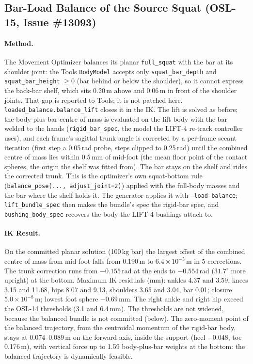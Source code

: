 \documentclass[11pt,a4paper]{article}
\begin{document}
\subsection{Bar-Load Balance of the Source Squat (OSL-15, Issue \#13093)}

\paragraph{Method.} The Movement Optimizer balances its planar
\texttt{full\_squat} with the bar at its shoulder joint: the Tools
\texttt{BodyModel} accepts only \texttt{squat\_bar\_depth} and
\texttt{squat\_bar\_height} $\ge 0$ (bar behind or below the shoulder), so it
cannot express the back-bar shelf, which sits 0.20\,m above and 0.06\,m in
front of the shoulder joints. That gap is reported to Tools; it is not
patched here. \texttt{loaded\_balance.balance\_lift} closes it in the IK. The
lift is solved as before; the body-plus-bar centre of mass is evaluated on the
lift body with the bar welded to the hands (\texttt{rigid\_bar\_spec}, the
model the LIFT-4 re-track controller uses), and each frame's sagittal trunk
angle is corrected by a per-frame secant iteration (first step a 0.05\,rad
probe, steps clipped to 0.25\,rad) until the combined centre of mass lies
within 0.5\,mm of mid-foot (the mean floor point of the contact spheres, the
origin the shelf was fitted from). The bar stays on the shelf and rides the
corrected trunk. This is the optimizer's own squat-bottom rule
(\texttt{balance\_pose(..., adjust\_joint=2)}) applied with the full-body
masses and the bar where the shelf holds it. The generator applies it with
\texttt{--load-balance}; \texttt{lift\_bundle\_spec} then makes the bundle's
spec the rigid-bar spec, and \texttt{bushing\_body\_spec} recovers the body
the LIFT-4 bushings attach to.

\paragraph{IK Result.} On the committed planar solution (100\,kg bar) the
largest offset of the combined centre of mass from mid-foot falls from
0.190\,m to $6.4\times10^{-5}$\,m in 5 corrections. The trunk correction
runs from $-0.155$\,rad at the ends to $-0.554$\,rad ($31.7^\circ$ more
upright) at the bottom. Maximum IK residuals (mm): ankles 4.37 and 3.59,
knees 3.15 and 11.68, hips 8.07 and 9.13, shoulders 3.65 and 3.04, bar 0.01;
closure $5.0\times10^{-8}$\,m; lowest foot sphere $-0.69$\,mm. The right ankle
and right hip exceed the OSL-14 thresholds (3.1 and 6.4\,mm). The thresholds
are not widened, because the balanced bundle is not committed (below). The
zero-moment point of the balanced trajectory, from the centroidal momentum
of the rigid-bar body, stays at 0.074--0.089\,m on the forward axis, inside
the support (heel $-0.048$, toe 0.176\,m), with vertical force up to 1.59
body-plus-bar weights at the bottom: the balanced trajectory is dynamically
feasible.
\end{document}
